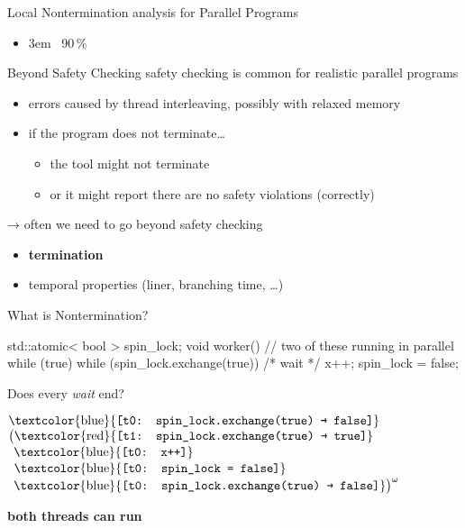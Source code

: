 \documentclass[aspectratio=169, fi]{paradise-slide}
\newcommand{\fcite}[1]{\emergencystretch 3em{\protect\NoHyper\cite{#1}}~\fullcite{#1}}
\newenvironment{prespart}[1]{%
  \begin{frame}{}%
    \centering
      {\Large #1} \par\bigskip\bigskip%
}{%
  \end{frame}%
}
\begin{document}
\begin{prespart}{Local Nontermination analysis for Parallel Programs}
  \begin{itemize}
    \item \fcite{SB2019} \hfill 90\,\%
  \end{itemize}
\end{prespart}

\begin{frame}{Beyond Safety Checking}
  safety checking is common for realistic parallel programs
  \begin{itemize}
    \item errors caused by thread interleaving, possibly with relaxed memory
    \pause
    \item if the program does not terminate…
    \begin{itemize}
      \item the tool might not terminate
      \item or it might report there are no safety violations (correctly)
    \end{itemize}
  \end{itemize}

  \pause\bigskip
  → often we need to go beyond safety checking
  \begin{itemize}
    \item \textbf{termination}
    \item temporal properties (liner, branching time, …)
  \end{itemize}
\end{frame}

\begin{frame}[fragile]{What is Nontermination?}
  \begin{cppcode}
  std::atomic< bool > spin_lock;
  void worker() { // two of these running in parallel
      while (true) {
          while (spin_lock.exchange(true)) { /* wait */ }
          x++;
          spin_lock = false;
      }
  }
  \end{cppcode}

  Does every \emph{wait} end? \pause

  \bigskip
  \newcommand{\ta}[1]{\text{\textcolor{blue}{\texttt{[t0: #1]}}}}
  \newcommand{\tb}[1]{\text{\textcolor{red}{\texttt{[t1: #1]}}}}
  $\ta{spin\_lock.exchange(true) \textrightarrow{} false}$\\
  $\big(\tb{spin\_lock.exchange(true) \textrightarrow{} true}$\\
  $\phantom{\big(}\ta{x++}$\\
  $\phantom{\big(}\ta{spin\_lock = false}$\\
  $\phantom{\big(}\ta{spin\_lock.exchange(true) \textrightarrow{} false}\big)^\omega$

  \medskip
  \textbf{both threads can run}
\end{frame}
\end{document}

